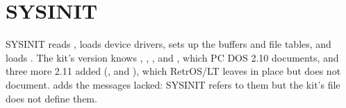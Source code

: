 \section{SYSINIT}

SYSINIT reads , loads device drivers, sets up the buffers
and file tables, and loads . The kit's version knows
, , ,  and ,
which PC DOS 2.10 documents, and three more 2.11 added
(,  and ), which RetrOS/LT
leaves in place but does not document.  adds the messages
 lacked: SYSINIT refers to them but the kit's file does
not define them.
